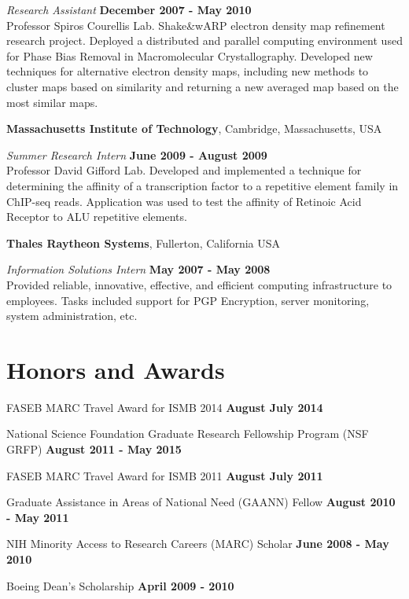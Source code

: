 \documentclass[margin,line]{res}
\begin{document}
\begin{resume}
{\em Research Assistant} \hfill {\bf December 2007 - May 2010}\\
Professor Spiros Courellis Lab. Shake\&wARP electron density map refinement
research project. Deployed a distributed and parallel computing environment used
for Phase Bias Removal in Macromolecular Crystallography. Developed new
techniques for alternative electron density maps, including new methods to
cluster maps based on similarity and returning a new averaged map based on the
most similar maps.

\newpage

{\bf Massachusetts Institute of Technology}, Cambridge, Massachusetts,
USA

\vspace{-.3cm}
{\em Summer Research Intern} \hfill {\bf June 2009 - August 2009}\\
Professor David Gifford Lab. Developed and implemented a technique for
determining the affinity of a transcription factor to a repetitive element
family in ChIP-seq reads. Application was used to test the affinity of Retinoic
Acid Receptor to ALU repetitive elements.

{\bf Thales Raytheon Systems}, Fullerton, California USA

\vspace{-.3cm}
{\em Information Solutions Intern} \hfill {\bf May 2007 - May 2008}\\
Provided reliable, innovative, effective, and efficient computing infrastructure
to employees. Tasks included support for PGP Encryption, server monitoring,
system administration, etc.


\section{\sc Honors and Awards}
FASEB MARC Travel Award for ISMB 2014 \hfill {\bf August
  July 2014}

National Science Foundation Graduate Research Fellowship Program (NSF GRFP)
\hfill {\bf August 2011 - May 2015}

FASEB MARC Travel Award for ISMB 2011 \hfill {\bf August
  July 2011}

Graduate Assistance in Areas of National Need (GAANN) Fellow \hfill {\bf August
  2010 - May 2011}

NIH Minority Access to Research Careers (MARC) Scholar \hfill {\bf
  June 2008 - May 2010}

Boeing Dean's Scholarship \hfill {\bf April 2009 - 2010}


\end{resume}
\end{document}
